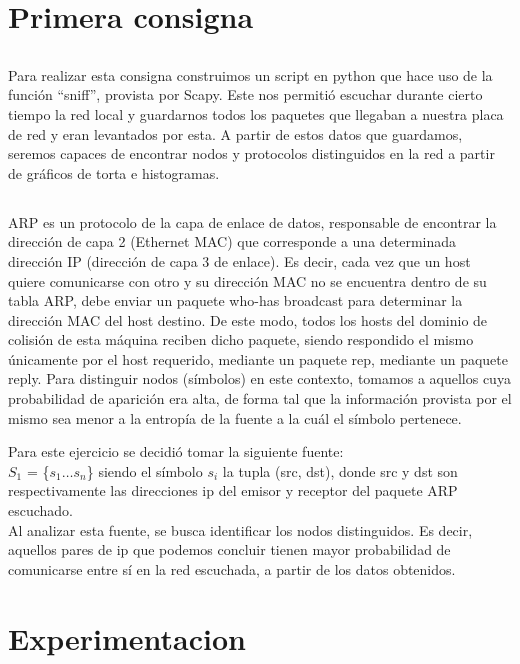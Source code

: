 \documentclass[final,narroweqnarray,inline]{ieee}
\begin{document}
\section{Primera consigna}

\subsection{}
Para realizar esta consigna construimos un script en python que hace uso de la
función ``sniff'', provista por Scapy. Este nos permitió escuchar durante
cierto tiempo la red local y guardarnos todos los paquetes que llegaban a
nuestra placa de red y eran levantados por esta. A partir de estos datos
que guardamos, seremos capaces de encontrar  nodos y protocolos
distinguidos en la red a partir de gráficos de torta e histogramas.

\subsection{}
ARP es un protocolo de la capa de enlace de datos, responsable de encontrar
la dirección de capa 2 (Ethernet MAC) que corresponde a una determinada
dirección IP (dirección de capa 3 de enlace). Es decir, cada vez que un host
quiere comunicarse con otro y su dirección MAC no se encuentra dentro de su
tabla ARP, debe enviar un paquete who-has broadcast para determinar la dirección MAC
del host destino. De este modo, todos los hosts del dominio de colisión de
esta máquina reciben dicho paquete, siendo respondido el mismo únicamente
por el host requerido, mediante un paquete rep, mediante un paquete reply.
Para distinguir nodos (símbolos) en este contexto, tomamos a aquellos cuya
probabilidad de aparición era alta, de forma tal que la información provista
por el mismo sea menor a la entropía de la fuente a la cuál el símbolo
pertenece.

\medskip
Para este ejercicio se decidi\'o tomar la siguiente fuente: \\ 
$S_{1}$ = \{$s_{1} \dots s_{n}$\} siendo el símbolo $s_{i}$ la tupla (src, dst), donde
src y dst son respectivamente las direcciones ip del emisor y receptor del
paquete ARP escuchado.  \\
Al analizar esta fuente, se busca identificar los nodos distinguidos. Es
decir, aquellos pares de ip que podemos concluir tienen mayor probabilidad de comunicarse
entre sí en la red escuchada, a partir de los datos obtenidos. 


\section{Experimentacion}
\end{document}
